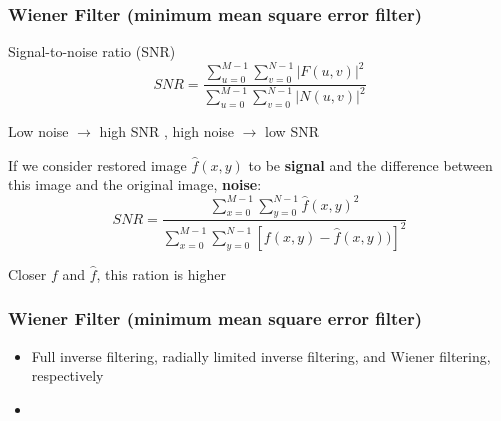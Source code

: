 \documentclass{beamer}
\begin{document}
\begin{frame}
\frametitle{Wiener Filter \small{(minimum mean square error filter)}}
\begin{itemize}
\scriptsize{
\item Signal-to-noise ratio (SNR)
$$SNR =\frac{\sum\limits^{M-1}_{u=0}\sum\limits^{N-1}_{v=0} \vert F(u,v)\vert^{2}}{\sum\limits^{M-1}_{u=0}\sum\limits^{N-1}_{v=0} \vert N(u,v)\vert^{2}} $$
\item Low noise $\rightarrow$ high SNR , high noise $\rightarrow$ low SNR
\item If we consider restored image $\hat{f}(x,y)$ to be \textbf{signal} and the difference between this image and the original image, \textbf{noise}: 
$$SNR = \frac{\sum\limits^{M-1}_{x=0}\sum\limits^{N-1}_{y=0} \hat{f}(x,y)^{2}}{\sum\limits^{M-1}_{x=0}\sum\limits^{N-1}_{y=0}[f(x,y)-\hat{f}(x,y))]^{2}} $$
\item Closer $f$ and $\hat{f}$, this ration is higher}
\end{itemize}
\end{frame}
\begin{frame}
\frametitle{Wiener Filter \small{(minimum mean square error filter)}}
\begin{itemize}
\item Full inverse filtering, radially limited inverse filtering, and Wiener filtering, respectively
\item[]
\end{itemize}
\end{frame}


\end{document}
